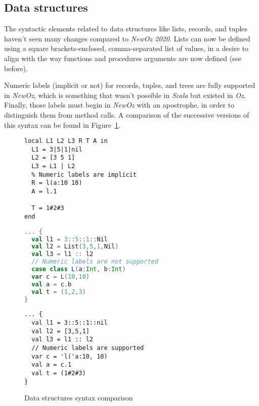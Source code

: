 \subsection{Data structures}
The syntactic elements related to data structures like lists, records, and tuples haven't seen many changes compared to \textit{NewOz 2020}.
Lists can now be defined using a square brackets-enclosed, comma-separated list of values, in a desire to align with the way functions and procedures arguments are now defined (see before).\newline

Numeric labels (implicit or not) for records, tuples, and trees are fully supported in \textit{NewOz}, which is something that wasn't possible in \textit{Scala} but existed in \textit{Oz}.
Finally, those labels must begin in \textit{NewOz} with an apostrophe, in order to distinguish them from method calls.\newline
A comparison of the successive versions of this syntax can be found in Figure~\ref{fig:code-comp-data}.
\begin{figure}
    \noindent\begin{minipage}{.49\textwidth}
        \begin{lstlisting}[title={Oz},language=oz]
local L1 L2 L3 R T A in
  L1 = 3|5|1|nil
  L2 = [3 5 1]
  L3 = L1 | L2
  % Numeric labels are implicit
  R = l(a:10 10)
  A = l.1

  T = 1#2#3
end
        \end{lstlisting}
    \end{minipage}
    \hfill
    \noindent\begin{minipage}{.49\textwidth}
        \begin{lstlisting}[title={Scala/Ozma},language=scala]
... {
  val l1 = 3::5::1::Nil
  val l2 = List(3,5,1,Nil)
  val l3 = l1 :: l2
  // Numeric labels are not supported
  case class L(a:Int, b:Int)
  var c = L(10,10)
  val a = c.b
  val t = (1,2,3)
}
        \end{lstlisting}
    \end{minipage}
    \begin{center}
    \noindent\begin{minipage}{.89\textwidth}
        \begin{lstlisting}[title={NewOz 2020/2021},language=newoz]
... {
  val l1 = 3::5::1::nil
  val l2 = [3,5,1]
  val l3 = l1 :: l2
  // Numeric labels are supported
  var c = 'l('a:10, 10)
  val a = c.1
  val t = (1#2#3)
}
        \end{lstlisting}
    \end{minipage}
    \end{center}
\caption{Data structures syntax comparison}
\label{fig:code-comp-data}
\end{figure}


